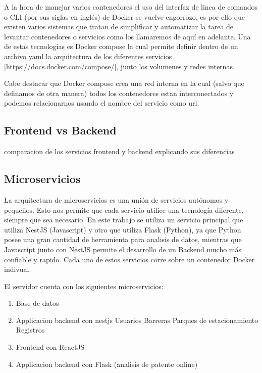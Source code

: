 A la hora de manejar varios contenedores el uso del interfaz de linea de comandos o CLI (por sus siglas en inglés) de Docker se vuelve engorrozo, es por ello que existen varios sistemas que tratan de simplificar y automatizar la tarea de levantar contenedores o servicios como los llamaremos de aquí en adelante. Una de estas tecnologías es Docker compose la cual permite definir dentro de un archivo yaml la arquitectura de los diferentes servicios [https://docs.docker.com/compose/], junto los volumenes y redes internas.

Cabe destacar que Docker compose crea una red interna en la cual (salvo que definamos de otra manera) todos los contenedores estan interconectados y podemos relacionarnos usando el nombre del servicio como url.

\subsection{Frontend vs Backend}

comparacion de los servicios frontend y backend explicando sus diferencias


\subsection{Microservicios}

La arquitectura de microservicios es una unión de servicios autónomos y pequeños. Esto nos permite que cada servicio utilice una tecnología diferente, siempre que sea necesario. En este trabajo se utiliza un servicio principal que utiliza NestJS (Javascript) y otro que utiliza Flask (Python), ya que Python posee una gran cantidad de herramienta para analisis de datos, mientras que Javascript junto con NestJS permite el desarrollo de un Backend mucho más confiable y rapido. Cada uno de estos servicios corre sobre un contenedor Docker indivual.

El servidor cuenta con los siguientes microservicios:

\begin{enumerate}
        \item Base de datos
        \item Applicacion backend con nestjs
              \subitem Usuarios
              \subitem Barreras
              \subitem Parques de estacionamiento
              \subitem Registros
        \item Frontend con ReactJS
        \item Applicacion backend con Flask (analisis de patente online)
\end{enumerate}


